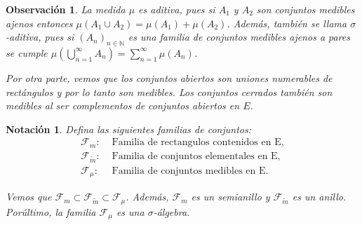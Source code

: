 \documentclass[twoside,12pt,a4 paper,openright]{book}
\newtheorem{ob}[claim]{Observaci\'on}
\newtheorem{nota}[claim]{Notaci\'on}
\begin{document}
\begin{ob}
La medida    $\mu$ es aditiva, pues si $A_1$ y $A_2$ son conjuntos medibles ajenos entonces $\mu(A_1\cup A_2) = \mu(A_1) + \mu(A_2)$. Adem\'as,   tambi\'en se llama $\sigma$-aditiva, pues si $(A_n)_{n\in \mathbb{N}}$ es una familia  de conjuntos medibles ajenos a pares se cumple $\mu\left(\bigcup_{n=1}^{\infty}A_n\right) = \sum_{n=1}^{\infty}\mu(A_n)$.

Por otra parte,  vemos que los conjuntos abiertos son uniones numerables de rect\'angulos y por lo tanto son medibles. Los conjuntos cerrados tambi\'en son medibles  al ser   complementos  de  conjuntos abiertos  en $E$. 

\end{ob}


\begin{nota}
Defina las siguientes familias de conjuntos:     \begin{align*}
        \mathcal{F}_{m}:&\text{ Familia de rectangulos contenidos en E},\\
        \mathcal{F}_{\tilde{m}}:&\text{ Familia de conjuntos elementales en E},\\
        \mathcal{F}_{\mu}:&\text{ Familia de conjuntos medibles en E}.
    \end{align*}
         
Vemos  que $\mathcal{F}_{m}\subset\mathcal{F}_{\tilde{m}}\subset\mathcal{F}_{\mu}$. Adem\'as, 
 $\mathcal{F}_{m}$ es un semianillo y   $ \mathcal{F}_{\tilde{m}}$ es un anillo. Por\'ultimo, la familia  
 $ \mathcal{F}_{\mu}$ es una $\sigma$-\'algebra.



\end{nota}
\end{document}
